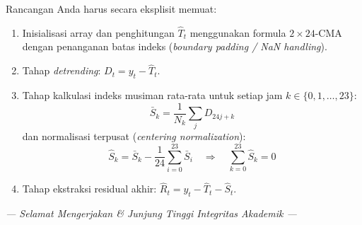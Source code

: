 \documentclass[11pt,a4paper]{article}
\begin{document}
\begin{enumerate}[leftmargin=1.5em, label=\textbf{Soal \arabic*.}]
    Rancangan Anda harus secara eksplisit memuat:
    \begin{enumerate}[label=\alph*.]
        \item Inisialisasi array dan penghitungan $\hat{T}_t$ menggunakan formula $2 \times 24$-CMA dengan penanganan batas indeks (\textit{boundary padding / NaN handling}).
        \item Tahap \textit{detrending}: $D_t = y_t - \hat{T}_t$.
        \item Tahap kalkulasi indeks musiman rata-rata untuk setiap jam $k \in \{0, 1, \dots, 23\}$:
        \begin{equation*}
            \bar{S}_k = \frac{1}{N_k}\sum_{j} D_{24j+k}
        \end{equation*}
        dan normalisasi terpusat (\textit{centering normalization}):
        \begin{equation*}
            \hat{S}_k = \bar{S}_k - \frac{1}{24}\sum_{i=0}^{23}\bar{S}_i \quad \Longrightarrow \quad \sum_{k=0}^{23}\hat{S}_k = 0
        \end{equation*}
        \item Tahap ekstraksi residual akhir: $\hat{R}_t = y_t - \hat{T}_t - \hat{S}_t$.
    \end{enumerate}

\end{enumerate}

\vspace{0.6cm}
\begin{center}
    \small \textit{--- Selamat Mengerjakan \& Junjung Tinggi Integritas Akademik ---}
\end{center}
\end{document}
